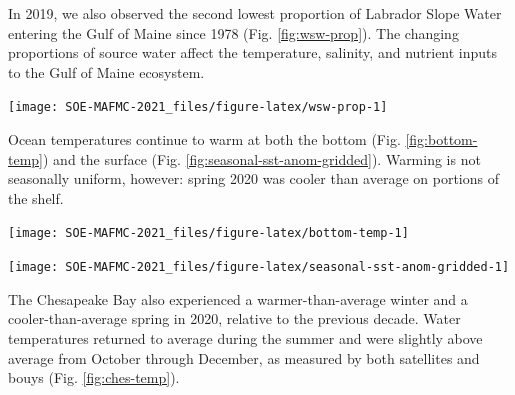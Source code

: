 \documentclass[
  10pt,
]{article}
\let\origfigure\figure
\let\endorigfigure\endfigure
\renewenvironment{figure}[1][2] {
    \expandafter\origfigure\expandafter[H]
} {
    \endorigfigure
}
\begin{document}
In 2019, we also observed the second lowest proportion of Labrador Slope
Water entering the Gulf of Maine since 1978 (Fig. \ref{fig:wsw-prop}).
The changing proportions of source water affect the temperature,
salinity, and nutrient inputs to the Gulf of Maine ecosystem.

\begin{figure}

{\centering \texttt{[image: SOE-MAFMC-2021\_files/figure-latex/wsw-prop-1]} 

}

\caption{Proportion of Warm Slope Water (WSW) and Labrador Slope Water (LSLW) entering the GOM through the Northeast Channel.}\label{fig:wsw-prop}
\end{figure}

Ocean temperatures continue to warm at both the bottom (Fig.
\ref{fig:bottom-temp}) and the surface (Fig.
\ref{fig:seasonal-sst-anom-gridded}). Warming is not seasonally uniform,
however: spring 2020 was cooler than average on portions of the shelf.

\begin{figure}

{\centering \texttt{[image: SOE-MAFMC-2021\_files/figure-latex/bottom-temp-1]} 

}

\caption{Annual bottom temperature in the Mid-Atlantic Bight. (black = in situ observations, red = observations assimilated by ocean model for comparison)}\label{fig:bottom-temp}
\end{figure}

\begin{figure}

{\centering \texttt{[image: SOE-MAFMC-2021\_files/figure-latex/seasonal-sst-anom-gridded-1]} 

}

\caption{MAB seasonal sea surface temperature (SST) time series overlaid onto 2020 seasonal spatial anomalies.}\label{fig:seasonal-sst-anom-gridded}
\end{figure}

The Chesapeake Bay also experienced a warmer-than-average winter and a
cooler-than-average spring in 2020, relative to the previous decade.
Water temperatures returned to average during the summer and were
slightly above average from October through December, as measured by
both satellites and bouys (Fig. \ref{fig:ches-temp}).\\
\end{document}
